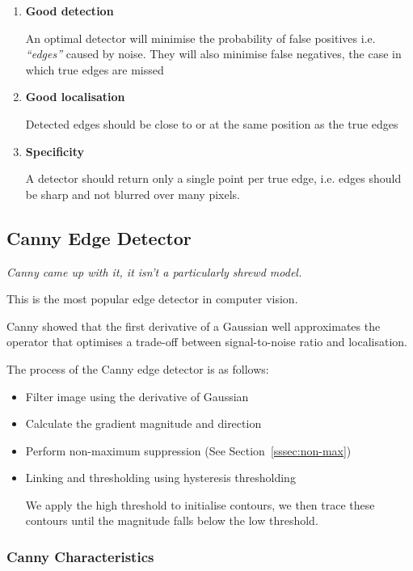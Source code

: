 \documentclass{article}
\begin{document}
\begin{enumerate}
  \item \textbf{Good detection}

        An optimal detector will minimise the probability of false positives i.e. \textit{``edges''} caused by noise. They will also minimise false negatives, the case in which true edges are missed

  \item \textbf{Good localisation}

        Detected edges should be close to or at the same position as the true edges

  \item \textbf{Specificity}

        A detector should return only a single point per true edge, i.e. edges should be sharp and not blurred over many pixels.
\end{enumerate}

\subsection{Canny Edge Detector}

\textit{Canny came up with it, it isn't a particularly shrewd model.}

This is the most popular edge detector in computer vision.

Canny showed that the first derivative of a Gaussian well approximates the operator that optimises a trade-off between signal-to-noise ratio and localisation.

The process of the Canny edge detector is as follows:

\begin{itemize}
  \item Filter image using the derivative of Gaussian
  \item Calculate the gradient magnitude and direction
  \item Perform non-maximum suppression (See Section~\ref{sssec:non-max})
  \item Linking and thresholding using hysteresis thresholding

        We apply the high threshold to initialise contours, we then trace these contours until the magnitude falls below the low threshold.
\end{itemize}

\subsubsection{Canny Characteristics}
\end{document}
